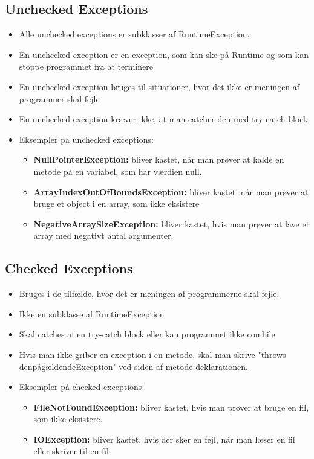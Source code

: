 \documentclass{article}
\begin{document}
\subsection{Unchecked Exceptions}
\begin{itemize}
	\item Alle unchecked exceptions er subklasser af RuntimeException.
	\item En unchecked exception er en exception, som kan ske på Runtime og som kan stoppe programmet fra at terminere
	\item En unchecked exception bruges til situationer, hvor det ikke er meningen af programmer skal fejle 
	\item En unchecked exception kræver ikke, at man catcher den med try-catch block 
	\item Eksempler på unchecked exceptions:
	\begin{itemize}
		\item \textbf{NullPointerException:} bliver kastet, når man prøver at kalde en metode på en variabel, som har værdien null.
		\item \textbf{ArrayIndexOutOfBoundsException:} bliver kastet, når man prøver at bruge et object i en array, som ikke eksistere
		\item \textbf{NegativeArraySizeException:} bliver kastet, hvis man prøver at lave et array med negativt antal argumenter. 
	\end{itemize}

\end{itemize}

\subsection{Checked Exceptions}
\begin{itemize}
	\item Bruges i de tilfælde, hvor det er meningen af programmerne skal fejle.
	\item Ikke en subklasse af RuntimeException 
	\item Skal catches af en try-catch block eller kan programmet ikke combile
	\item Hvis man ikke griber en exception i en metode, skal man skrive "throws denpågældendeException" ved siden af metode deklarationen.
	\item Eksempler på checked exceptions:
	\begin{itemize}
		\item \textbf{FileNotFoundException:} bliver kastet, hvis man prøver at bruge en fil, som ikke eksistere. 
		\item \textbf{IOException: } bliver kastet, hvis der sker en fejl, når man læser en fil eller skriver til en fil.  
	\end{itemize}
\end{itemize}
\end{document}
